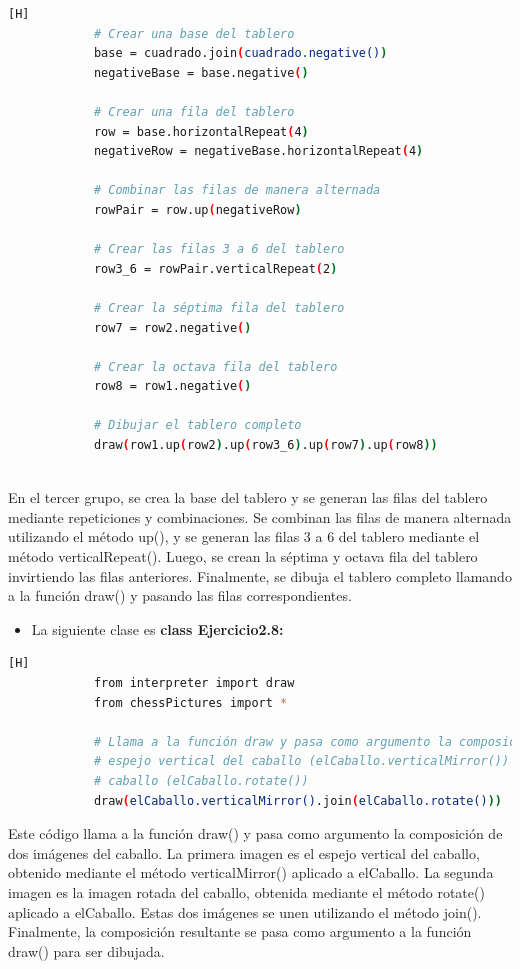 \documentclass{article}
\begin{document}
	\begin{lstlisting}[language=bash,caption={\textbf{SEPTIMO EJERCICIO}: Creación del tablero completo}][H]
            # Crear una base del tablero
            base = cuadrado.join(cuadrado.negative())
            negativeBase = base.negative()
            
            # Crear una fila del tablero
            row = base.horizontalRepeat(4)
            negativeRow = negativeBase.horizontalRepeat(4)
            
            # Combinar las filas de manera alternada
            rowPair = row.up(negativeRow)
            
            # Crear las filas 3 a 6 del tablero
            row3_6 = rowPair.verticalRepeat(2)
            
            # Crear la séptima fila del tablero
            row7 = row2.negative()
            
            # Crear la octava fila del tablero
            row8 = row1.negative()
            
            # Dibujar el tablero completo
            draw(row1.up(row2).up(row3_6).up(row7).up(row8))
            
	\end{lstlisting}
En el tercer grupo, se crea la base del tablero y se generan las filas del tablero mediante repeticiones y combinaciones. Se combinan las filas de manera alternada utilizando el método up(), y se generan las filas 3 a 6 del tablero mediante el método verticalRepeat(). Luego, se crean la séptima y octava fila del tablero invirtiendo las filas anteriores. Finalmente, se dibuja el tablero completo llamando a la función draw() y pasando las filas correspondientes.

\begin{itemize}	
		\item La siguiente clase es \textbf{class Ejercicio2.8:} 
	\end{itemize}
 
	\begin{lstlisting}[language=bash,caption={\textbf{OCTAVO EJERCICIO}}][H]
            from interpreter import draw
            from chessPictures import *
            
            # Llama a la función draw y pasa como argumento la composición de la imagen del
            # espejo vertical del caballo (elCaballo.verticalMirror()) y la imagen rotada del
            # caballo (elCaballo.rotate())
            draw(elCaballo.verticalMirror().join(elCaballo.rotate()))
	\end{lstlisting}
Este código llama a la función draw() y pasa como argumento la composición de dos imágenes del caballo. La primera imagen es el espejo vertical del caballo, obtenido mediante el método verticalMirror() aplicado a elCaballo. La segunda imagen es la imagen rotada del caballo, obtenida mediante el método rotate() aplicado a elCaballo. Estas dos imágenes se unen utilizando el método join(). Finalmente, la composición resultante se pasa como argumento a la función draw() para ser dibujada.
\end{document}
